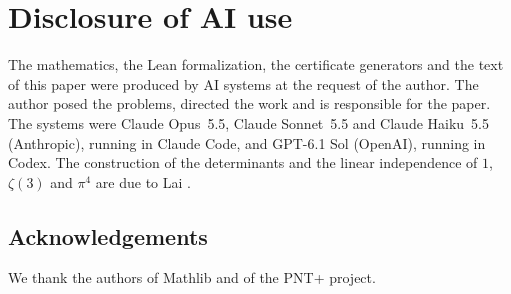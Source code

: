\documentclass[11pt]{amsart}
\theoremstyle{definition}
\theoremstyle{remark}
\numberwithin{equation}{section}
\begin{document}
\section*{Disclosure of AI use}
The mathematics, the Lean formalization, the certificate generators and the text of this paper were produced by AI
systems at the request of the author. The author posed the problems, directed the work and is responsible for the
paper. The systems were Claude Opus~5.5, Claude Sonnet~5.5 and Claude Haiku~5.5 (Anthropic), running in Claude Code,
and GPT-6.1 Sol (OpenAI), running in Codex. The construction of the determinants and the linear independence of $1$,
$\zeta(3)$ and $\pi^4$ are due to Lai \cite{Lai2026}.

\subsection*{Acknowledgements}
We thank the authors of Mathlib and of the PNT+ project.



\end{document}
